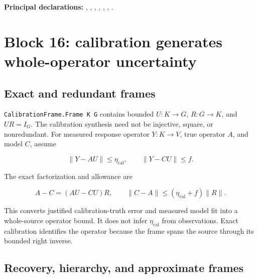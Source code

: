\documentclass[11pt]{article}
\begin{document}
\textbf{Principal declarations:}
\texttt{},
\texttt{},
\texttt{},
\texttt{},
\texttt{},
\texttt{},
\texttt{}.

\hypertarget{block-16-calibration-generates-whole-operator-uncertainty}{%
\section{Block 16: calibration generates whole-operator
uncertainty}\label{block-16-calibration-generates-whole-operator-uncertainty}}

\hypertarget{exact-and-redundant-frames}{%
\subsection{Exact and redundant
frames}\label{exact-and-redundant-frames}}

\texttt{CalibrationFrame.Frame K G} contains bounded
\(U:K\to G\), \(R:G\to K\), and \(UR=I_G\). The calibration synthesis
need not be injective, square, or nonredundant. For measured response
operator \(Y:K\to V\), true operator \(A\), and model \(C\), assume

\[
\|Y-AU\|\le\eta_{\mathrm{cal}},\qquad
\|Y-CU\|\le f.
\]

The exact factorization and allowance are

\[
A-C=(AU-CU)R,\qquad
\|C-A\|\le(\eta_{\mathrm{cal}}+f)\|R\|.
\]

This converts justified calibration-truth error and measured model fit
into a whole-source operator bound. It does not infer
\(\eta_{\mathrm{cal}}\) from observations. Exact calibration identifies
the operator because the frame spans the source through its bounded
right inverse.

\hypertarget{recovery-hierarchy-and-approximate-frames}{%
\subsection{Recovery, hierarchy, and approximate
frames}\label{recovery-hierarchy-and-approximate-frames}}
\end{document}
